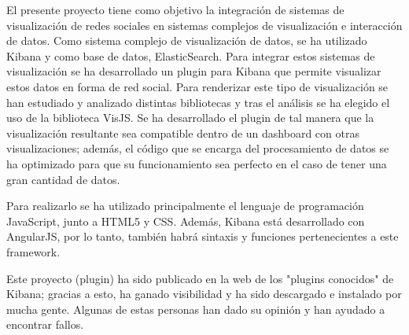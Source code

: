 \documentclass[a4paper, 12pt]{book}
\begin{document}
 El presente proyecto tiene como objetivo la integración de sistemas de visualización de redes sociales en sistemas complejos de visualización e interacción de datos. Como sistema complejo de visualización de datos, se ha utilizado Kibana y como base de datos, ElasticSearch. Para integrar estos sistemas de visualización se ha desarrollado un plugin para Kibana que permite visualizar estos datos en forma de red social. Para renderizar este tipo de visualización se han estudiado y analizado distintas bibliotecas y tras el análisis se ha elegido el uso de la biblioteca VisJS. Se ha desarrollado el plugin de tal manera que la visualización resultante sea compatible dentro de un dashboard con otras visualizaciones; además, el código que se encarga del procesamiento de datos se ha optimizado para que su funcionamiento sea perfecto en el caso de tener una gran cantidad de datos.
 
Para realizarlo se ha utilizado principalmente el lenguaje de programación JavaScript, junto a HTML5 y CSS. Además, Kibana está desarrollado con AngularJS, por lo tanto, también habrá sintaxis y funciones pertenecientes a este framework.
 
Este proyecto (plugin) ha sido publicado en la web de los "plugins conocidos" de Kibana; gracias a esto, ha ganado visibilidad y ha sido descargado e instalado por mucha gente. Algunas de estas personas han dado su opinión y han ayudado a encontrar fallos.



\tableofcontents 
\cleardoublepage
\listoffigures %

\end{document}
